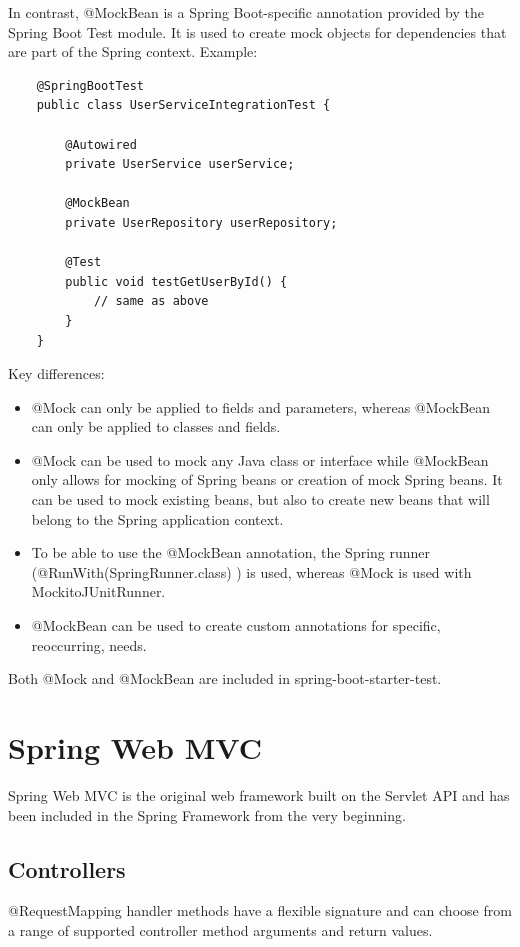 \documentclass{scrartcl}
\begin{document}
In contrast, @MockBean is a Spring Boot-specific annotation provided by the Spring Boot Test module. It is used to create mock objects for dependencies that are part of the Spring context.
Example:

\begin{lstlisting}
    @SpringBootTest
    public class UserServiceIntegrationTest {

        @Autowired
        private UserService userService;

        @MockBean
        private UserRepository userRepository;

        @Test
        public void testGetUserById() {
            // same as above
        }
    }
\end{lstlisting}


Key differences:

\begin{itemize}
    \item @Mock can only be applied to fields and parameters, whereas @MockBean can only be applied to classes and fields.
    \item @Mock can be used to mock any Java class or interface while @MockBean only allows for mocking of Spring beans or creation of mock Spring beans. It can be used to mock existing beans, but also to create new beans that will belong to the Spring application context.
    \item To be able to use the @MockBean annotation, the Spring runner (@RunWith(SpringRunner.class) ) is used, whereas @Mock is used with MockitoJUnitRunner.
    \item @MockBean can be used to create custom annotations for specific, reoccurring, needs.
\end{itemize}

Both @Mock and @MockBean are included in spring-boot-starter-test.

\section{Spring Web MVC}

Spring Web MVC is the original web framework built on the Servlet API and has been included in the Spring Framework from the very beginning.

\subsection{Controllers}

    @RequestMapping handler methods have a flexible signature and can choose from a range of supported controller method arguments and return values.
\end{document}
